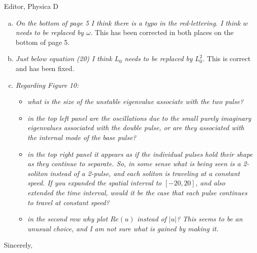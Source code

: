 \documentclass[11pt]{letter}
\begin{document}
\begin{letter}{Editor, Physica D}
\begin{enumerate}[(a)]
\item \emph{On the bottom of page 5 I think there is a typo in the red-lettering. I think $w$ needs to be replaced by $\omega$.} This has been corrected in both places on the bottom of page 5.

\item \emph{Just below equation (20) I think $L_0$ needs to be replaced by $L_0^2$.} This is correct and has been fixed.

\item \emph{Regarding Figure 10:}

\begin{itemize}
\item \emph{what is the size of the unstable eigenvalue associate with the two pulse?}

\item \emph{in the top left panel are the oscillations due to the small purely imaginary eigenvalues associated with the double pulse, or are they associated with the internal mode of the base pulse?}

\item \emph{in the top right panel it appears as if the individual pulses hold their shape as they continue to separate. So, in some sense what is being seen is a 2-soliton instead of a 2-pulse, and each soliton is traveling at a constant speed. If you expanded the spatial interval to $[-20, 20]$, and also extended the time interval, would it be the case that each pulse continues to travel at constant speed?}

\item \emph{in the second row why plot $Re(u)$ instead of $|u|$? This seems to be an unusual choice, and I am not sure what is gained by making it.}

\end{itemize}

\end{enumerate}

\closing{Sincerely,}

\end{letter}
\end{document}

